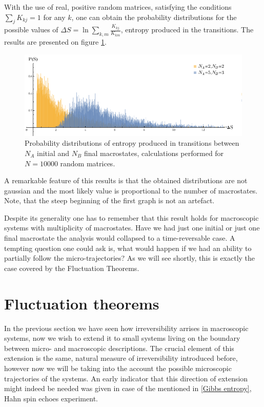 \documentclass[a4paper,12pt]{article}
\begin{document}
With the use of real, positive random matrices, satisfying the conditions $\sum_j K_{kj} = 1$ for any $k$, one can obtain the probability distributions for the possible values of $\Delta S = \ln{\sum_{k,m} \frac{K_{kj}}{K_{km}}} $, entropy produced in the transitions. The results are presented on figure \ref{Fig5}.
\begin{figure}[ht!]
\centering \includegraphics[width=14cm]{Figure5} \caption{Probability distributions of entropy produced in transitions between $N_A$ initial and $N_B$ final macrostates, calculations performed for $N=10000$ random matrices.}
\label{Fig5} 
\end{figure}
A remarkable feature of this results is that the obtained distributions are not gaussian and the most likely value is proportional to the number of macrostates. Note, that the steep beginning of the first graph is not an artefact.


Despite its generality one has to remember that this result holds for macroscopic systems with multiplicity of macrostates. Have we had just one initial or just one final macrostate the analysis would collapsed to a time-reversable case. A tempting question one could ask is, what would happen if we had an ability to partially follow the micro-trajectories? As we will see shortly, this is exactly the case covered by the Fluctuation Theorems.

\section{Fluctuation theorems}
\label{FluctuationTheorems}
In the previous section we have seen how irreversibility arrises in macroscopic systems, now we wish to extend it to small systems living on the boundary between micro- and macroscopic descriptions. The crucial element of this extension is the same, natural measure of irreversibility introduced before, however now we will be taking into the account the possible microscopic trajectories of the systems. 
An early indicator that this direction of extension might indeed be needed was given in case of the mentioned in \ref{Gibbs entropy}, Hahn spin echoes experiment.
\end{document}
